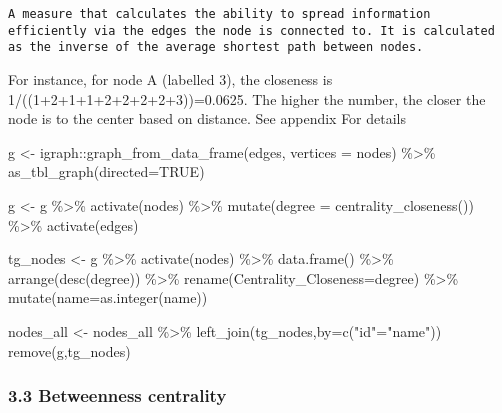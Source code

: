 \documentclass[
]{article}
\newenvironment{Shaded}{\begin{snugshade}}{\end{snugshade}}
\newcommand{\AttributeTok}[1]{\textcolor[rgb]{0.77,0.63,0.00}{#1}}
\newcommand{\ConstantTok}[1]{\textcolor[rgb]{0.00,0.00,0.00}{#1}}
\newcommand{\FunctionTok}[1]{\textcolor[rgb]{0.00,0.00,0.00}{#1}}
\newcommand{\NormalTok}[1]{#1}
\newcommand{\OtherTok}[1]{\textcolor[rgb]{0.56,0.35,0.01}{#1}}
\newcommand{\SpecialCharTok}[1]{\textcolor[rgb]{0.00,0.00,0.00}{#1}}
\newcommand{\StringTok}[1]{\textcolor[rgb]{0.31,0.60,0.02}{#1}}
\begin{document}
\begin{verbatim}
A measure that calculates the ability to spread information efficiently via the edges the node is connected to. It is calculated as the inverse of the average shortest path between nodes.
\end{verbatim}

For instance, for node A (labelled 3), the closeness is
1/((1+2+1+1+2+2+2+2+3))=0.0625. The higher the number, the closer the
node is to the center based on distance. See appendix For details

\begin{Shaded}
\begin{Highlighting}[]
\NormalTok{g }\OtherTok{\textless{}{-}}\NormalTok{ igraph}\SpecialCharTok{::}\FunctionTok{graph\_from\_data\_frame}\NormalTok{(edges, }\AttributeTok{vertices =}\NormalTok{ nodes) }\SpecialCharTok{\%\textgreater{}\%} \FunctionTok{as\_tbl\_graph}\NormalTok{(}\AttributeTok{directed=}\ConstantTok{TRUE}\NormalTok{)}

\NormalTok{g }\OtherTok{\textless{}{-}}\NormalTok{ g }\SpecialCharTok{\%\textgreater{}\%} 
  \FunctionTok{activate}\NormalTok{(nodes) }\SpecialCharTok{\%\textgreater{}\%} 
  \FunctionTok{mutate}\NormalTok{(}\AttributeTok{degree =} \FunctionTok{centrality\_closeness}\NormalTok{()) }\SpecialCharTok{\%\textgreater{}\%} 
  \FunctionTok{activate}\NormalTok{(edges)}

\NormalTok{tg\_nodes }\OtherTok{\textless{}{-}}
\NormalTok{  g }\SpecialCharTok{\%\textgreater{}\%}
  \FunctionTok{activate}\NormalTok{(nodes) }\SpecialCharTok{\%\textgreater{}\%}
  \FunctionTok{data.frame}\NormalTok{() }\SpecialCharTok{\%\textgreater{}\%}
  \FunctionTok{arrange}\NormalTok{(}\FunctionTok{desc}\NormalTok{(degree)) }\SpecialCharTok{\%\textgreater{}\%}
  \FunctionTok{rename}\NormalTok{(}\AttributeTok{Centrality\_Closeness=}\NormalTok{degree) }\SpecialCharTok{\%\textgreater{}\%}
  \FunctionTok{mutate}\NormalTok{(}\AttributeTok{name=}\FunctionTok{as.integer}\NormalTok{(name))}

\NormalTok{nodes\_all }\OtherTok{\textless{}{-}}\NormalTok{ nodes\_all }\SpecialCharTok{\%\textgreater{}\%}
  \FunctionTok{left\_join}\NormalTok{(tg\_nodes,}\AttributeTok{by=}\FunctionTok{c}\NormalTok{(}\StringTok{"id"}\OtherTok{=}\StringTok{"name"}\NormalTok{)) }
\FunctionTok{remove}\NormalTok{(g,tg\_nodes)}
\end{Highlighting}
\end{Shaded}

\hypertarget{betweenness-centrality}{%
\subsubsection{3.3 Betweenness
centrality}\label{betweenness-centrality}}
\end{document}
